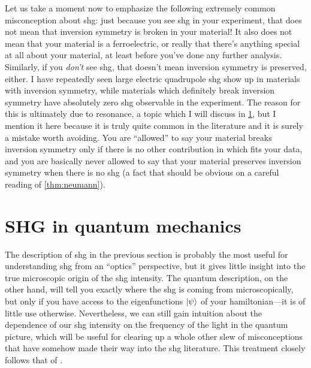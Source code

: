 Let us take a moment now to emphasize the following extremely common misconception about \gls{shg}: just because you see \gls{shg} in your experiment, that does not mean that inversion symmetry is broken in your material!
It also does not mean that your material is a ferroelectric, or really that there's anything special at all about your material, at least before you've done any further analysis.
Similarly, if you \emph{don't} see \gls{shg}, that doesn't mean inversion symmetry is preserved, either.
I have repeatedly seen large electric quadrupole \gls{shg} show up in materials with inversion symmetry, while materials which definitely break inversion symmetry have absolutely zero \gls{shg} observable in the experiment.
The reason for this is ultimately due to resonance, a topic which I will discuss in \cref{sec:resonance}, but I mention it here because it is truly quite common in the literature and it is surely a mistake worth avoiding.
You are ``allowed'' to say your material breaks inversion symmetry only if there is no other contribution in  which fits your data, and you are basically never allowed to say that your material preserves inversion symmetry when there is no \gls{shg} (a fact that should be obvious on a careful reading of \cref{thm:neumann}).

\section{SHG in quantum mechanics}\label{sec:resonance}

The description of \gls{shg} in the previous section is probably the most useful for understanding \gls{shg} from an ``optics'' perspective, but it gives little insight into the true microscopic origin of the \gls{shg} intensity.
The quantum description, on the other hand, will tell you exactly where the \gls{shg} is coming from microscopically, but only if you have access to the eigenfunctions $\ket{\psi}$ of your hamiltonian---it is of little use otherwise.
Nevertheless, we can still gain intuition about the dependence of our \gls{shg} intensity on the frequency of the light in the quantum picture, which will be useful for clearing up a whole other slew of misconceptions that have somehow made their way into the \gls{shg} literature.
This treatment closely follows that of \citet{boyd}.

